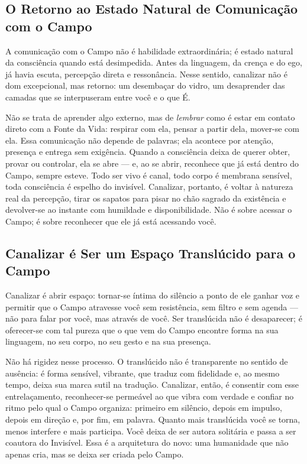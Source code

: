 \documentclass[12pt]{book}
\begin{document}
\subsection*{O Retorno ao Estado Natural de Comunicação com o Campo}

A comunicação com o Campo não é habilidade extraordinária; é estado natural da consciência quando está desimpedida. Antes da linguagem, da crença e do ego, já havia escuta, percepção direta e ressonância. Nesse sentido, canalizar não é dom excepcional, mas retorno: um desembaçar do vidro, um desaprender das camadas que se interpuseram entre você e o que É.

Não se trata de aprender algo externo, mas de \textit{lembrar} como é estar em contato direto com a Fonte da Vida: respirar com ela, pensar a partir dela, mover-se com ela. Essa comunicação não depende de palavras; ela acontece por atenção, presença e entrega sem exigência. Quando a consciência deixa de querer obter, provar ou controlar, ela se abre — e, ao se abrir, reconhece que já está dentro do Campo, sempre esteve. Todo ser vivo é canal, todo corpo é membrana sensível, toda consciência é espelho do invisível. Canalizar, portanto, é voltar à natureza real da percepção, tirar os sapatos para pisar no chão sagrado da existência e devolver-se ao instante com humildade e disponibilidade. Não é sobre acessar o Campo; é sobre reconhecer que ele já está acessando você.

\subsection*{Canalizar é Ser um Espaço Translúcido para o Campo}

Canalizar é abrir espaço: tornar-se íntima do silêncio a ponto de ele ganhar voz e permitir que o Campo atravesse você sem resistência, sem filtro e sem agenda — não para falar por você, mas através de você. Ser translúcida não é desaparecer; é oferecer-se com tal pureza que o que vem do Campo encontre forma na sua linguagem, no seu corpo, no seu gesto e na sua presença.

Não há rigidez nesse processo. O translúcido não é transparente no sentido de ausência: é forma sensível, vibrante, que traduz com fidelidade e, ao mesmo tempo, deixa sua marca sutil na tradução. Canalizar, então, é consentir com esse entrelaçamento, reconhecer-se permeável ao que vibra com verdade e confiar no ritmo pelo qual o Campo organiza: primeiro em silêncio, depois em impulso, depois em direção e, por fim, em palavra. Quanto mais translúcida você se torna, menos interfere e mais participa. Você deixa de ser autora solitária e passa a ser coautora do Invisível. Essa é a arquitetura do novo: uma humanidade que não apenas cria, mas se deixa ser criada pelo Campo.
\end{document}
